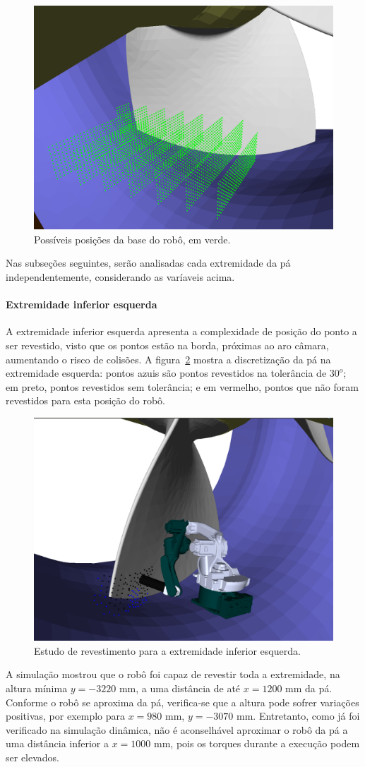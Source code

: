 \begin{figure}[!ht]
	\centering	
	\includegraphics[width=.5\columnwidth]{figs/trilho2all.png}
	\caption{Possíveis posições da base do robô, em verde.}
	\label{fig::trilho2all}
\end{figure}

Nas subseções seguintes, serão analisadas cada extremidade da
pá independentemente, considerando as varíaveis acima.

\paragraph{Extremidade inferior esquerda}

A extremidade inferior esquerda apresenta a complexidade de posição do ponto a
ser revestido, visto que os pontos estão na borda, próximas ao aro câmara,
aumentando o risco de colisões. A figura~\ref{fig::footleft} mostra a
discretização da pá na extremidade esquerda: pontos azuis são pontos revestidos
na tolerância de $30^o$; em preto, pontos revestidos sem tolerância; e em
vermelho, pontos que não foram revestidos para esta posição do robô.

\begin{figure}[!ht]
	\centering	
	\includegraphics[width=.5\columnwidth]{figs/footleft.png}
	\caption{Estudo de revestimento para a extremidade inferior esquerda.}
	\label{fig::footleft}
\end{figure}

A simulação mostrou que o robô foi capaz de revestir toda a extremidade, na
altura mínima $y=-3220$ mm, a uma distância de até $x=1200$ mm da pá. Conforme o
robô se aproxima da pá, verifica-se que a altura pode sofrer variações
positivas, por exemplo para $x=980$ mm, $y=-3070$ mm. Entretanto, como já foi
verificado na simulação dinâmica, não é aconselhável aproximar o robô da pá a
uma distância inferior a $x=1000$ mm, pois os torques durante a execução podem ser
elevados.

